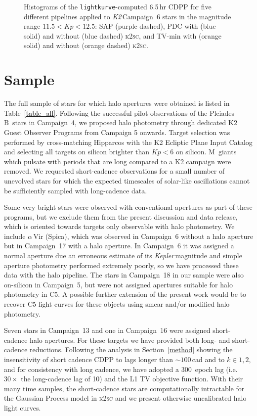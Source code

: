 \documentclass[modern]{aastex62}
\newcommand\kepler{\emph{Kepler}\,}
\newcommand\ktwo{\emph{K2}\,}
\begin{document}
\begin{figure}
\caption{Histograms of the \texttt{lightkurve}-computed 6.5\,hr CDPP for five different pipelines applied to \ktwo Campaign~6 stars in the magnitude range $11.5 < Kp < 12.5$: SAP (purple dashed), PDC with (blue solid) and without (blue dashed) \textsc{k2sc}, and TV-min with (orange solid) and without (orange dashed) \textsc{k2sc}.}
\label{fig:cdpphists}
\end{figure}


\section{Sample}
\label{sec:sample}


The full sample of stars for which halo apertures were obtained is listed in Table~\ref{table_all}. Following the successful pilot observations of the Pleiades B~stars in Campaign~4, we proposed halo photometry through dedicated K2 Guest Observer Programs from Campaign 5 onwards. Target selection was performed by cross-matching Hipparcos \citep{leeuwen07} with the K2 Ecliptic Plane Input Catalog \citep[EPIC,][]{huber16} and selecting all targets on silicon brighter than $Kp < 6$ on silicon. M~giants which pulsate with periods that are long compared to a K2 campaign were removed. We requested short-cadence observations for a small number of unevolved stars for which the expected timescales of solar-like oscillations cannot be sufficiently sampled with long-cadence data.


 Some very bright stars were observed with conventional apertures as part of these programs, but we exclude them from the present discussion and data release, which is oriented towards targets only observable with halo photometry. 
We include $\alpha$\,Vir (Spica), which was observed in Campaign~6 without a halo aperture but in Campaign~17 with a halo aperture. In Campaign~6 it was assigned a normal aperture due an erroneous estimate of its \kepler magnitude and simple aperture photometry performed extremely poorly, so we have processed these data with the halo pipeline. The stars in Campaign~18 in our sample were also on-silicon in Campaign~5, but were not assigned apertures suitable for halo photometry in C5. A possible further extension of the present work would be to recover C5 light curves for these objects using smear and/or modified halo photometry.

Seven stars in Campaign~13 and one in Campaign~16 were assigned short-cadence halo apertures. For these targets we have provided both long- and short-cadence reductions. Following the analysis in Section~\ref{method} showing the insensitivity of short cadence CDPP to lags longer than $\sim 100$\,cad and to $k \in {1,2}$, and for consistency with long cadence, we have adopted a 300~epoch lag (i.e. $30 \times$ the long-cadence lag of 10) and the L1 TV objective function. With their many time samples, the short-cadence stars are computationally intractable for the Gaussian Process model in \textsc{k2sc} and we present otherwise uncalibrated halo light curves.
\end{document}
